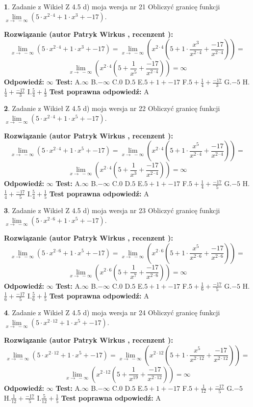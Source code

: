 \documentclass[12pt, a4paper]{article}
\theoremstyle{definition} %
\newtheorem{zad}{}
\newcommand{\zadStart}[1]{\begin{zad}#1\newline}
\newcommand{\zadStop}{\end{zad}}
\newcommand{\rozwStart}[2]{\noindent \textbf{Rozwiązanie (autor #1 , recenzent #2): }\newline}
\newcommand{\rozwStop}{\newline}
\newcommand{\odpStart}{\noindent \textbf{Odpowiedź:}\newline}
\newcommand{\odpStop}{\newline}
\newcommand{\testStart}{\noindent \textbf{Test:}\newline}
\newcommand{\testStop}{\newline}
\newcommand{\kluczStart}{\noindent \textbf{Test poprawna odpowiedź:}\newline}
\newcommand{\kluczStop}{\newline}
\begin{document}
\zadStart{Zadanie z Wikieł Z 4.5 d) moja wersja nr 21}
Obliczyć granicę funkcji  $\lim\limits_{x\to\ -\infty}(5 \cdot x^{2\cdot4}+1 \cdot x^{3}+-17)$.
\zadStop
\rozwStart{Patryk Wirkus}{}
$$\lim\limits_{x\to\ -\infty}(5 \cdot x^{2\cdot4}+1 \cdot x^{3}+-17) = \lim\limits_{x\to\ -\infty}(x^{2\cdot4}(5 +1 \cdot \frac{x^{3}}{x^{2\cdot4}}+\frac{-17}{x^{2\cdot4}})) =$$ $$\lim\limits_{x\to\ -\infty}(x^{2\cdot4}(5 +\frac{1}{x^{5}}+\frac{-17}{x^{2\cdot4}})) =\infty$$
\rozwStop
\odpStart
$\infty$
\odpStop
\testStart
A.$\infty$ B.$-\infty$ C.$0$ D.$5$ E.$5 + 1 + -17$
F.$5+\frac{1}{4}+\frac{-17}{3}$ G.$-5$
H.$\frac{1}{4}+\frac{-17}{3}$
I.$\frac{5}{4}+\frac{1}{3}$
\testStop
\kluczStart
A
\kluczStop



\zadStart{Zadanie z Wikieł Z 4.5 d) moja wersja nr 22}
Obliczyć granicę funkcji  $\lim\limits_{x\to\ -\infty}(5 \cdot x^{2\cdot4}+1 \cdot x^{5}+-17)$.
\zadStop
\rozwStart{Patryk Wirkus}{}
$$\lim\limits_{x\to\ -\infty}(5 \cdot x^{2\cdot4}+1 \cdot x^{5}+-17) = \lim\limits_{x\to\ -\infty}(x^{2\cdot4}(5 +1 \cdot \frac{x^{5}}{x^{2\cdot4}}+\frac{-17}{x^{2\cdot4}})) =$$ $$\lim\limits_{x\to\ -\infty}(x^{2\cdot4}(5 +\frac{1}{x^{3}}+\frac{-17}{x^{2\cdot4}})) =\infty$$
\rozwStop
\odpStart
$\infty$
\odpStop
\testStart
A.$\infty$ B.$-\infty$ C.$0$ D.$5$ E.$5 + 1 + -17$
F.$5+\frac{1}{4}+\frac{-17}{5}$ G.$-5$
H.$\frac{1}{4}+\frac{-17}{5}$
I.$\frac{5}{4}+\frac{1}{5}$
\testStop
\kluczStart
A
\kluczStop



\zadStart{Zadanie z Wikieł Z 4.5 d) moja wersja nr 23}
Obliczyć granicę funkcji  $\lim\limits_{x\to\ -\infty}(5 \cdot x^{2\cdot6}+1 \cdot x^{5}+-17)$.
\zadStop
\rozwStart{Patryk Wirkus}{}
$$\lim\limits_{x\to\ -\infty}(5 \cdot x^{2\cdot6}+1 \cdot x^{5}+-17) = \lim\limits_{x\to\ -\infty}(x^{2\cdot6}(5 +1 \cdot \frac{x^{5}}{x^{2\cdot6}}+\frac{-17}{x^{2\cdot6}})) =$$ $$\lim\limits_{x\to\ -\infty}(x^{2\cdot6}(5 +\frac{1}{x^{7}}+\frac{-17}{x^{2\cdot6}})) =\infty$$
\rozwStop
\odpStart
$\infty$
\odpStop
\testStart
A.$\infty$ B.$-\infty$ C.$0$ D.$5$ E.$5 + 1 + -17$
F.$5+\frac{1}{6}+\frac{-17}{5}$ G.$-5$
H.$\frac{1}{6}+\frac{-17}{5}$
I.$\frac{5}{6}+\frac{1}{5}$
\testStop
\kluczStart
A
\kluczStop



\zadStart{Zadanie z Wikieł Z 4.5 d) moja wersja nr 24}
Obliczyć granicę funkcji  $\lim\limits_{x\to\ -\infty}(5 \cdot x^{2\cdot12}+1 \cdot x^{5}+-17)$.
\zadStop
\rozwStart{Patryk Wirkus}{}
$$\lim\limits_{x\to\ -\infty}(5 \cdot x^{2\cdot12}+1 \cdot x^{5}+-17) = \lim\limits_{x\to\ -\infty}(x^{2\cdot12}(5 +1 \cdot \frac{x^{5}}{x^{2\cdot12}}+\frac{-17}{x^{2\cdot12}})) =$$ $$\lim\limits_{x\to\ -\infty}(x^{2\cdot12}(5 +\frac{1}{x^{19}}+\frac{-17}{x^{2\cdot12}})) =\infty$$
\rozwStop
\odpStart
$\infty$
\odpStop
\testStart
A.$\infty$ B.$-\infty$ C.$0$ D.$5$ E.$5 + 1 + -17$
F.$5+\frac{1}{12}+\frac{-17}{5}$ G.$-5$
H.$\frac{1}{12}+\frac{-17}{5}$
I.$\frac{5}{12}+\frac{1}{5}$
\testStop
\kluczStart
A
\kluczStop
\end{document}
